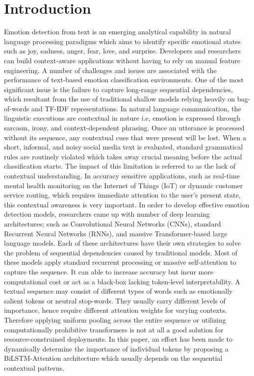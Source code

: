 \documentclass[conference]{IEEEtran}
\begin{document}
\section{Introduction}
Emotion detection from text is an emerging analytical capability in natural 
language processing paradigms which aims to identify specific emotional 
states such as joy, sadness, anger, fear, love, and surprise. Developers 
and researchers can build context-aware applications without having to 
rely on manual feature engineering. A number of challenges and issues are 
associated with the performance of text-based emotion classification 
environments. One of the most significant issue is the failure to capture 
long-range sequential dependencies, which resultant from the use of 
traditional shallow models relying heavily on bag-of-words and TF-IDF 
representations. In natural language communication, the linguistic 
executions are contextual in nature i.e, emotion is expressed through 
sarcasm, irony, and context-dependent phrasing. Once an utterance is 
processed without its sequence, any contextual cues that were present 
will be lost. When a short, informal, and noisy social media text is 
evaluated, standard grammatical rules are routinely violated which takes 
away crucial meaning before the actual classification starts. The impact 
of this limitation is referred to as the lack of contextual understanding. 
In accuracy sensitive applications, such as real-time mental health monitoring 
on the Internet of Things (IoT) or dynamic customer service routing, which 
requires immediate attention to the user's present state, this contextual 
awareness is very important. In order to develop effective emotion detection 
models, researchers came up with number of deep learning architectures; 
such as Convolutional Neural Networks (CNNs), standard Recurrent Neural 
Networks (RNNs), and massive Transformer-based large language models. Each 
of these architectures have their own strategies to solve the problem of 
sequential dependencies caused by traditional models. Most of these models 
apply standard recurrent processing or massive self-attention to capture 
the sequence. It can able to increase accuracy but incur more computational 
cost or act as a black-box lacking token-level interpretability. A textual 
sequence may consist of different types of words such as emotionally salient 
tokens or neutral stop-words. They usually carry different levels of 
importance, hence require different attention weights for varying contexts. 
Therefore applying uniform pooling across the entire sequence or utilizing 
computationally prohibitive transformers is not at all a good solution for 
resource-constrained deployments. In this paper, an effort has been made 
to dynamically determine the importance of individual tokens by proposing 
a BiLSTM-Attention architecture which usually depends on the sequential 
contextual patterns.
\end{document}
